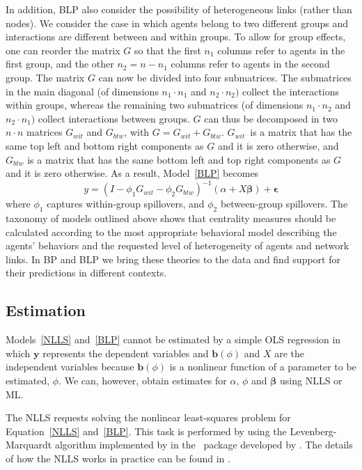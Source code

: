 \documentclass[nojss]{jss}
\begin{document}
In addition, BLP also consider the possibility of heterogeneous links
(rather than nodes).  We consider the case in which agents belong to two
different groups and interactions are different between and within groups. 
To allow for group effects, one can reorder the matrix $G$ so that the first
$n_{1}$ columns refer to agents in the first group, and the other
$n_{2}=n-n_{1}$ columns refer to agents in the second group.  The matrix $G$
can now be divided into four submatrices.  The submatrices in the main
diagonal (of dimensions $n_{1}\cdot n_{1}$ and $n_{2}\cdot n_{2})$ collect
the interactions within groups, whereas the remaining two submatrices (of
dimensions $n_{1}\cdot n_{2}$ and $n_{2}\cdot n_{1})$ collect interactions
between groups.  $G$ can thus be decomposed in two $n\cdot n$ matrices
$G_{wit}$ and $G_{btw}$, with $G=G_{wit}+G_{btw}$.  $G_{wit}$\ is a matrix
that has the same top left and bottom right components as $G$ and it is zero
otherwise, and $G_{btw}$ is a matrix that has the same bottom left and top
right components as $G$ and it is zero otherwise.  As a result, Model~\ref{BLP} becomes
%
\begin{equation}
y=(I-\phi _{1}G_{wit}-\phi _{2}G_{btw})^{-1}(\alpha +X\mathbf{\beta })+
\mathbf{\epsilon }
\label{BLP_4}
\end{equation}
%
where $\phi _{1}$ captures within-group spillovers, and $\phi _{2}$
between-group spillovers.  The taxonomy of models outlined above shows that
centrality measures should be calculated according to the most appropriate
behavioral model describing the agents' behaviors and the requested level of
heterogeneity of agents and network links.  In BP and BLP we bring these
theories to the data and find support for their predictions in different
contexts.

\subsection{Estimation} \label{sec:estimation}

Models~\ref{NLLS} and~\ref{BLP} cannot be estimated by a simple OLS
regression in which $\mathbf{y}$ represents the dependent variables and
$\mathbf{b}(\phi)$ and $X$ are the independent variables because
$\mathbf{b}(\phi)$ is a nonlinear function of a parameter to be estimated,
$\phi $.  We can, however, obtain estimates for $\alpha $, $\phi$ and
$\mathbf{\beta}$ using NLLS or ML.

The NLLS requests solving the nonlinear least-squares problem for
Equation~\ref{NLLS} and~\ref{BLP}.  This task is performed by 
using the Levenberg-Marquardt algorithm implemented by \cite{Box:1969} in
the ~package  developed by \cite{minpack.lm}. 
The details of how the NLLS works in practice can be found in
\cite{More:1978}.
\end{document}
